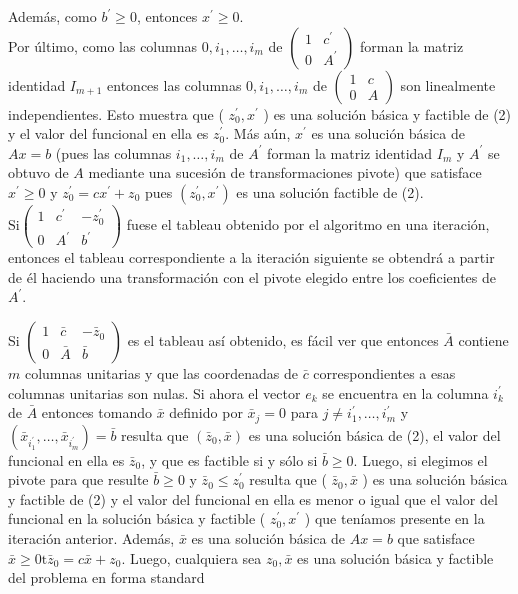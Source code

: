 \documentclass[10pt]{article}
\begin{document}
Además, como $b^{\prime} \geq 0$, entonces $x^{\prime} \geq 0$.\\
Por último, como las columnas $0, i_{1}, \ldots, i_{m}$ de $\left(\begin{array}{cc}1 & c^{\prime} \\ 0 & A^{\prime}\end{array}\right)$ forman la matriz identidad $I_{m+1}$ entonces las columnas $0, i_{1}, \ldots, i_{m}$ de $\left(\begin{array}{cc}1 & c \\ 0 & A\end{array}\right)$ son linealmente independientes. Esto muestra que ( $z_{0}^{\prime}, x^{\prime}$ ) es una solución básica y factible de (2) y el valor del funcional en ella es $z_{0}^{\prime}$. Más aún, $x^{\prime}$ es una solución básica de $A x=b$ (pues las columnas $i_{1}, \ldots, i_{m}$ de $A^{\prime}$ forman la matriz identidad $I_{m}$ y $A^{\prime}$ se obtuvo de $A$ mediante una sucesión de transformaciones pivote) que satisface $x^{\prime} \geq 0$ y $z_{0}^{\prime}=c x^{\prime}+z_{0}$ pues $\left(z_{0}^{\prime}, x^{\prime}\right)$ es una solución factible de (2). $\mathrm{Si}\left(\begin{array}{cc|c}1 & c^{\prime} & -z_{0}^{\prime} \\ 0 & A^{\prime} & b^{\prime}\end{array}\right)$ fuese el tableau obtenido por el algoritmo en una iteración, entonces el tableau correspondiente a la iteración siguiente se obtendrá a partir de él haciendo una transformación con el pivote elegido entre los coeficientes de $A^{\prime}$.

Si $\left(\begin{array}{cc|c}1 & \bar{c} & -\bar{z}_{0} \\ 0 & \bar{A} & \bar{b}\end{array}\right)$ es el tableau así obtenido, es fácil ver que entonces $\bar{A}$ contiene $m$ columnas unitarias y que las coordenadas de $\bar{c}$ correspondientes a esas columnas unitarias son nulas. Si ahora el vector $e_{k}$ se encuentra en la columna $i_{k}^{\prime}$ de $\bar{A}$ entonces tomando $\bar{x}$ definido por $\bar{x}_{j}=0$ para $j \neq i_{1}^{\prime}, \ldots, i_{m}^{\prime}$ y $\left(\bar{x}_{i_{1}^{\prime}}, \ldots, \bar{x}_{i_{m}^{\prime}}\right)=\bar{b}$ resulta que $\left(\bar{z}_{0}, \bar{x}\right)$ es una solución básica de (2), el valor del funcional en ella es $\bar{z}_{0}$, y que es factible si y sólo si $\bar{b} \geq 0$. Luego, si elegimos el pivote para que resulte $\bar{b} \geq 0$ y $\bar{z}_{0} \leq z_{0}^{\prime}$ resulta que ( $\bar{z}_{0}, \bar{x}$ ) es una solución básica y factible de (2) y el valor del funcional en ella es menor o igual que el valor del funcional en la solución básica y factible ( $z_{0}^{\prime}, x^{\prime}$ ) que teníamos presente en la iteración anterior. Además, $\bar{x}$ es una solución básica de $A x=b$ que satisface $\bar{x} \geq 0 \mathrm{t} \bar{z}_{0}=c \bar{x}+z_{0}$. Luego, cualquiera sea $z_{0}, \bar{x}$ es una solución básica y factible del problema en forma standard
\end{document}
